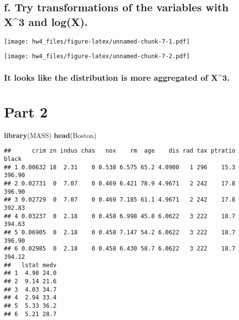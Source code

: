 \documentclass[]{article}
\newenvironment{Shaded}{\begin{snugshade}}{\end{snugshade}}
\newcommand{\DecValTok}[1]{\textcolor[rgb]{0.00,0.00,0.81}{#1}}
\newcommand{\KeywordTok}[1]{\textcolor[rgb]{0.13,0.29,0.53}{\textbf{#1}}}
\newcommand{\NormalTok}[1]{#1}
\newcommand{\OperatorTok}[1]{\textcolor[rgb]{0.81,0.36,0.00}{\textbf{#1}}}
\begin{document}
\hypertarget{f.-try-transformations-of-the-variables-with-x3-and-logx.}{%
\subsection{f. Try transformations of the variables with X\^{}3 and
log(X).}\label{f.-try-transformations-of-the-variables-with-x3-and-logx.}}

\begin{Shaded}
\end{Shaded}

\texttt{[image: hw4\_files/figure-latex/unnamed-chunk-7-1.pdf]}

\begin{Shaded}
\end{Shaded}

\texttt{[image: hw4\_files/figure-latex/unnamed-chunk-7-2.pdf]}

\hypertarget{it-looks-like-the-distribution-is-more-aggregated-of-x3.}{%
\subsubsection{It looks like the distribution is more aggregated of
X\^{}3.}\label{it-looks-like-the-distribution-is-more-aggregated-of-x3.}}

\hypertarget{part-2}{%
\section{Part 2}\label{part-2}}

\begin{Shaded}
\begin{Highlighting}[]
\KeywordTok{library}\NormalTok{(MASS)}
\KeywordTok{head}\NormalTok{(Boston)}
\end{Highlighting}
\end{Shaded}

\begin{verbatim}
##      crim zn indus chas   nox    rm  age    dis rad tax ptratio  black
## 1 0.00632 18  2.31    0 0.538 6.575 65.2 4.0900   1 296    15.3 396.90
## 2 0.02731  0  7.07    0 0.469 6.421 78.9 4.9671   2 242    17.8 396.90
## 3 0.02729  0  7.07    0 0.469 7.185 61.1 4.9671   2 242    17.8 392.83
## 4 0.03237  0  2.18    0 0.458 6.998 45.8 6.0622   3 222    18.7 394.63
## 5 0.06905  0  2.18    0 0.458 7.147 54.2 6.0622   3 222    18.7 396.90
## 6 0.02985  0  2.18    0 0.458 6.430 58.7 6.0622   3 222    18.7 394.12
##   lstat medv
## 1  4.98 24.0
## 2  9.14 21.6
## 3  4.03 34.7
## 4  2.94 33.4
## 5  5.33 36.2
## 6  5.21 28.7
\end{verbatim}
\end{document}
